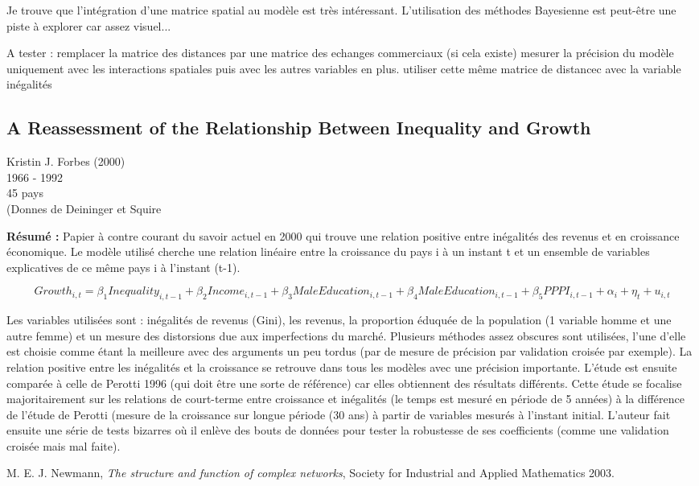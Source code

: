 \documentclass[11pt,a4paper]{article}
\begin{document}
Je trouve que l'intégration d'une matrice spatial au modèle est très intéressant. L'utilisation des méthodes Bayesienne est peut-être une piste à explorer car assez visuel... 

A tester :
remplacer la matrice des distances par une matrice des echanges commerciaux (si cela existe)
mesurer la précision du modèle uniquement avec les interactions spatiales puis avec les autres variables en plus.
utiliser cette même matrice de distancec avec la variable inégalités

\subsection{A Reassessment of the Relationship Between Inequality and Growth}
Kristin J. Forbes (2000) \\
1966 - 1992 \\
45 pays  \\
(Donnes de Deininger et Squire

\noindent
\textbf{Résumé :}
Papier à contre courant du savoir actuel en 2000 qui trouve une relation positive entre inégalités des revenus et en croissance économique. Le modèle utilisé cherche une relation linéaire entre la croissance du pays i à un instant t et un ensemble de variables explicatives de ce même pays i à l'instant (t-1). 

\begin{dmath}
Growth_{i,t} = \beta_1 Inequality_{i,t - 1} + \beta_2 Income_{i,t - 1} + \beta_3 MaleEducation_{i,t - 1} + \beta_4 MaleEducation_{i,t - 1} + \beta_5 PPPI_{i, t - 1} + \alpha_i + \eta_t + u_{i,t}
\end{dmath}

Les variables utilisées sont : inégalités de revenus (Gini), les revenus, la proportion éduquée de la population (1 variable homme et une autre femme) et un mesure des distorsions due aux imperfections du marché. Plusieurs méthodes assez obscures sont utilisées, l'une d'elle est choisie comme étant la meilleure avec des arguments un peu tordus (par de mesure de précision par validation croisée par exemple). La relation positive entre les inégalités et la croissance se retrouve dans tous les modèles avec une précision importante. L'étude est ensuite comparée à celle de Perotti 1996 (qui doit être une sorte de référence) car elles obtiennent des résultats différents. Cette étude se focalise majoritairement sur les relations de court-terme entre croissance et inégalités (le temps est mesuré en période de 5 années) à la différence de l'étude de Perotti (mesure de la croissance sur longue période (30 ans) à partir de variables mesurés à l'instant initial. L'auteur fait ensuite une série de tests bizarres où il enlève des bouts de données pour tester la robustesse de ses coefficients (comme une validation croisée mais mal faite).

\begin{thebibliography}{99}

  M. E. J. Newmann, 
  \emph{The structure and function of complex networks},
  Society for Industrial and Applied Mathematics
  2003.

\end{thebibliography}
\end{document}
